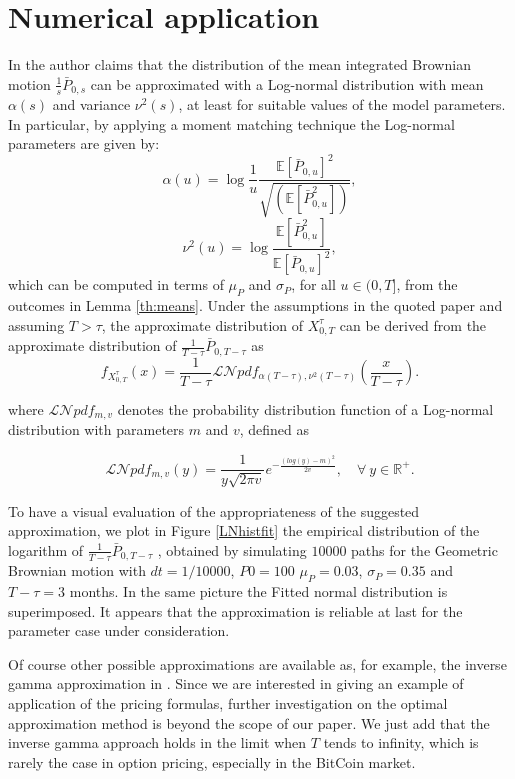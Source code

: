 \documentclass[12pt,centertags,reqno]{amsart}
\numberwithin{equation}{section} \makeatletter
\def \R {\mathbb R}
\newcommand{\esp}[2][\mathbb E] {#1\left[#2\right]}
\begin{document}
\section{Numerical application}

In \citet{levy1992pricing} the author claims that the distribution of the mean integrated Brownian motion $\frac{1}{s} \bar{P}_{0,s}$ can be approximated with a Log-normal distribution with mean $\alpha(s)$ and variance $\nu^2(s)$, at least for suitable values of the model parameters. In particular, by applying a moment matching technique the Log-normal parameters are given by:
$$
\alpha(u)=\log\frac{1}{u} \frac{\esp{\bar{P}_{0,u}}^2}{\sqrt{\left(\esp{\bar{P}_{0,u}^2}\right)}},
$$
$$
\nu^2(u)=\log \frac{\esp{ \bar{P}_{0,u}^2}}{\esp{\bar{P}_{0,u}}^2},
$$
which can be computed in terms of $\mu_P$ and $\sigma_P$, for all $u \in (0,T]$, from the outcomes in Lemma \ref{th:means}. 
Under the assumptions in the quoted paper and assuming $T>\tau$, the approximate distribution of $X_{0,T}^\tau$ can be derived from the approximate distribution of $\frac{1}{T-\tau} \bar{P}_{0,T-\tau}$ as 
$$
f_{X_{0,T}^\tau}(x)=\frac{1}{T-\tau} \mathcal{LN} pdf_{\alpha(T-\tau),\nu^2(T-\tau)} \left(\frac{x}{T-\tau}\right).
$$

where $ \mathcal{LN} pdf_{m,v} $ denotes the probability distribution function of a Log-normal distribution with parameters $m$ and $v$, defined as

$$
\mathcal{LN} pdf_{m,v}(y)=\frac{1}{y\sqrt{2\pi v}} e^{-\frac{(log (y)-m)^2}{2v}}, \quad \forall\ y \in \R^+.
$$

To have a visual evaluation of the appropriateness of the suggested approximation, we plot in Figure \ref{LNhistfit} the empirical distribution of the logarithm of $\frac{1}{T-\tau} \bar{P}_{0,T-\tau}$ , obtained by simulating $10000$ paths for the Geometric Brownian motion with $dt=1/10000$, $P0=100$ $\mu_P=0.03$, $\sigma_P=0.35$ and  $T-\tau=3$ months. In the same picture the Fitted normal distribution is superimposed.
It appears that the approximation is reliable at last for the parameter case under consideration.

Of course other possible approximations are available as, for example, the inverse gamma approximation in \citet{MilPosner}. Since we are interested in giving an example of application of the pricing formulas, further investigation on the optimal approximation method is beyond the scope of our paper. We just add that the inverse gamma approach holds in the limit when $T$ tends to infinity, which is rarely the case in option pricing, especially in the BitCoin market.
\end{document}
